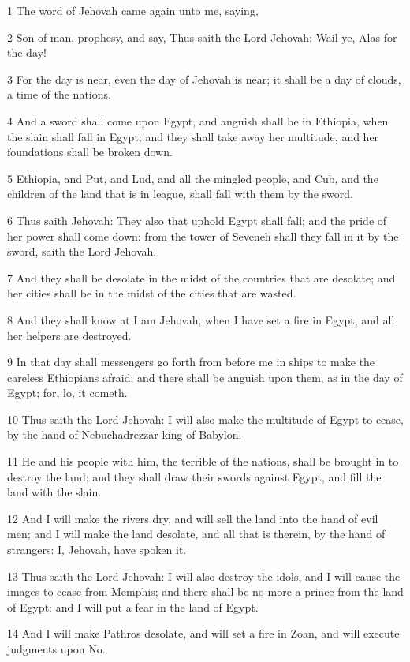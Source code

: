 \par 1 The word of Jehovah came again unto me, saying,
\par 2 Son of man, prophesy, and say, Thus saith the Lord Jehovah: Wail ye, Alas for the day!
\par 3 For the day is near, even the day of Jehovah is near; it shall be a day of clouds, a time of the nations.
\par 4 And a sword shall come upon Egypt, and anguish shall be in Ethiopia, when the slain shall fall in Egypt; and they shall take away her multitude, and her foundations shall be broken down.
\par 5 Ethiopia, and Put, and Lud, and all the mingled people, and Cub, and the children of the land that is in league, shall fall with them by the sword.
\par 6 Thus saith Jehovah: They also that uphold Egypt shall fall; and the pride of her power shall come down: from the tower of Seveneh shall they fall in it by the sword, saith the Lord Jehovah.
\par 7 And they shall be desolate in the midst of the countries that are desolate; and her cities shall be in the midst of the cities that are wasted.
\par 8 And they shall know at I am Jehovah, when I have set a fire in Egypt, and all her helpers are destroyed.
\par 9 In that day shall messengers go forth from before me in ships to make the careless Ethiopians afraid; and there shall be anguish upon them, as in the day of Egypt; for, lo, it cometh.
\par 10 Thus saith the Lord Jehovah: I will also make the multitude of Egypt to cease, by the hand of Nebuchadrezzar king of Babylon.
\par 11 He and his people with him, the terrible of the nations, shall be brought in to destroy the land; and they shall draw their swords against Egypt, and fill the land with the slain.
\par 12 And I will make the rivers dry, and will sell the land into the hand of evil men; and I will make the land desolate, and all that is therein, by the hand of strangers: I, Jehovah, have spoken it.
\par 13 Thus saith the Lord Jehovah: I will also destroy the idols, and I will cause the images to cease from Memphis; and there shall be no more a prince from the land of Egypt: and I will put a fear in the land of Egypt.
\par 14 And I will make Pathros desolate, and will set a fire in Zoan, and will execute judgments upon No.
